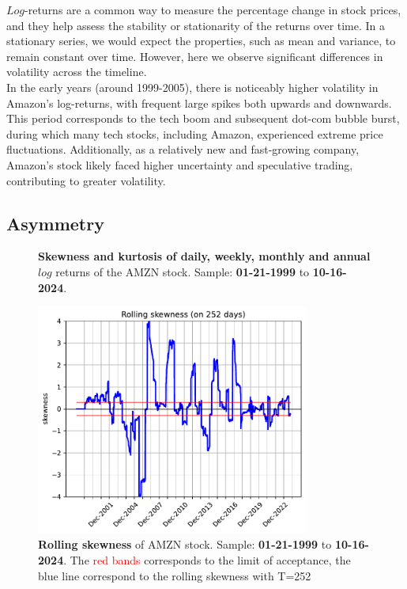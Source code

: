 \documentclass{article}
\begin{document}
\noindent $Log$-returns are a common way to measure the percentage change in stock prices, 
and they help assess the stability or stationarity of the returns over time. In a stationary series, we would expect the properties, 
such as mean and variance, to remain constant over time. 
However, here we observe significant differences in volatility across the timeline. \\

\noindent In the early years (around 1999-2005), there is noticeably higher volatility in Amazon's log-returns, 
with frequent large spikes both upwards and downwards. This period corresponds to the tech boom and subsequent dot-com bubble burst, 
during which many tech stocks, including Amazon, experienced extreme price fluctuations. 
Additionally, as a relatively new and fast-growing company, Amazon’s stock likely faced higher uncertainty and speculative trading, 
contributing to greater volatility.

\subsection{Asymmetry}

\begin{figure}[H]
    \centering
    \begin{minipage}{0.45\textwidth}
        \begin{table}[H]
            \centering
              
            \caption{\textbf{Skewness and kurtosis of daily, weekly, monthly and annual} $log$ returns of the AMZN stock. 
            Sample: \textbf{01-21-1999} to \textbf{10-16-2024}.}
            \label{tab:skewness_kurtosis}
        \end{table}
    \end{minipage}
    \hspace{0.05\textwidth}
    \begin{minipage}{0.45\textwidth}
        \centering
        \includegraphics[width=0.8\textwidth]{Img/Fact3_2_rollskew.pdf}
        \caption{\textbf{Rolling skewness} of AMZN stock. 
        Sample: \textbf{01-21-1999} to \textbf{10-16-2024}. The \textcolor{red}{red bands} corresponds to the limit of acceptance, the blue line correspond to the rolling skewness with T=252}
        \label{fig:Rolling_skewness}
    \end{minipage}
\end{figure}
\end{document}
